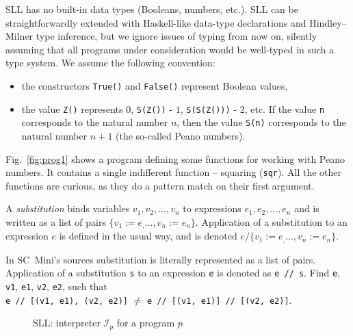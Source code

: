SLL has no built-in data types (Booleans, numbers, etc.). 
SLL can be straightforwardly extended with Haskell-like data-type
declarations and Hindley–Milner type inference, but we ignore
issues of typing from now on, silently assuming that all
programs under consideration would be well-typed
in such a type system.
We assume the following convention:
\begin{itemize}
  \item the constructors \texttt{True()} and \texttt{False()} represent Boolean values,
  \item the value \texttt{Z()} represents $0$, \texttt{S(Z())} - $1$, \texttt{S(S(Z()))} - $2$, etc. 
    If the value \texttt{n} corresponds to the natural number $n$, then the value \texttt{S(n)}
	corresponds to the natural number $n+1$ (the so-called Peano numbers).
\end{itemize}

Fig.~\ref{fig:prog1} shows a program defining some functions for working
with Peano numbers.
It contains a single indifferent function -- squaring (\texttt{sqr}).
All the other functions are curious, as they do a pattern match on their first argument.

A \emph{substitution} binds variables $v_1, v_2, \ldots, v_n$ to expressions $e_1, e_2, \ldots, e_n$ 
and is written as a list of pairs $\{v_1:=e_, \ldots, v_n := e_n\}$.
Application of a substitution to an expression $e$ is defined in the usual way, and 
is denoted $e / \{v_1:=e_, \ldots, v_n := e_n\}$.

\begin{exercise}
In SC~Mini's sources substitution is literally represented as a list of pairs.
Application of a substitution \texttt{s} to an expression \texttt{e} is denoted as \texttt{e~//~s}.
Find \texttt{e}, \texttt{v1}, \texttt{e1}, \texttt{v2}, \texttt{e2}, such that
\\ \texttt{e // [(v1, e1), (v2, e2)]} $\not =$ \texttt{e // [(v1, e1)] // [(v2, e2)]}.
\end{exercise}


\begin{figure}[t!]
\caption{SLL: interpreter $\mathcal{I}_p$ for a program $p$}

\label{fig-sll-semantics}
\end{figure}

